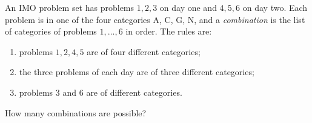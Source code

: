 An IMO problem set has problems $1,2,3$ on day one and $4,5,6$ on day two. Each problem is in one of the four categories A, C, G, N, and a \emph{combination} is the list of categories of problems $1,\ldots,6$ in order. The rules are:
\begin{enumerate}
\item problems $1,2,4,5$ are of four different categories;
\item the three problems of each day are of three different categories;
\item problems $3$ and $6$ are of different categories.
\end{enumerate}
How many combinations are possible?
